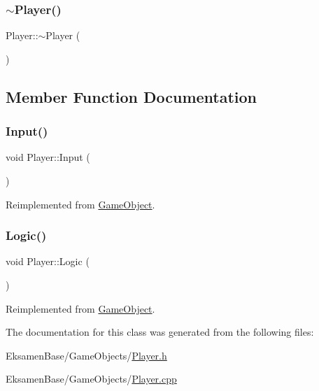 \mbox{\label{class_player_a749d2c00e1fe0f5c2746f7505a58c062}} 
\subsubsection{\texorpdfstring{$\sim$\+Player()}{~Player()}}
{\footnotesize\ttfamily Player\+::$\sim$\+Player (\begin{DoxyParamCaption}{ }\end{DoxyParamCaption})}



\subsection{Member Function Documentation}
\mbox{\label{class_player_a65a76094cff6f149d5847d2110fe443d}} 
\subsubsection{\texorpdfstring{Input()}{Input()}}
{\footnotesize\ttfamily void Player\+::\+Input (\begin{DoxyParamCaption}{ }\end{DoxyParamCaption})\hspace{0.3cm}{\ttfamily [virtual]}}



Reimplemented from \mbox{\hyperlink{class_game_object_a430742cf91abb99337c556c88bef880a}{Game\+Object}}.

\mbox{\label{class_player_ae30c8d49de94ee8c73ed6ab6315a2854}} 
\subsubsection{\texorpdfstring{Logic()}{Logic()}}
{\footnotesize\ttfamily void Player\+::\+Logic (\begin{DoxyParamCaption}{ }\end{DoxyParamCaption})\hspace{0.3cm}{\ttfamily [virtual]}}



Reimplemented from \mbox{\hyperlink{class_game_object_a79510ffc77339fe850491dce9f580fa9}{Game\+Object}}.



The documentation for this class was generated from the following files\+:\begin{DoxyCompactItemize}
\item 
Eksamen\+Base/\+Game\+Objects/\mbox{\hyperlink{_player_8h}{Player.\+h}}\item 
Eksamen\+Base/\+Game\+Objects/\mbox{\hyperlink{_player_8cpp}{Player.\+cpp}}\end{DoxyCompactItemize}
